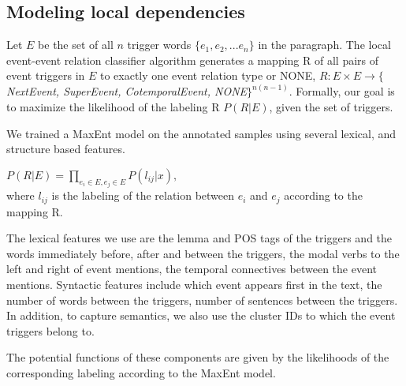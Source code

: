 \subsection{Modeling local dependencies}
Let $E$ be the set of all $n$ trigger words $\{e_1, e_2, ... e_{n}\}$ in the paragraph. The local event-event relation classifier algorithm generates a mapping R of all pairs of event triggers in $E$ to exactly one event relation type or NONE, $R : E \times E \rightarrow \{ $ {\em NextEvent, SuperEvent, CotemporalEvent, NONE}$ \}^{n (n-1)}$. Formally, our goal is to maximize the likelihood of the labeling R $P(R | E)$, given the set of triggers.

We trained a MaxEnt model on the annotated samples using several lexical, and structure based features.

$P(R | E) = \prod_{e_{i}\in E, e_j \in E} P(l_{ij} | x), $\\
where $l_{ij}$ is the labeling of the relation between $e_i$ and $e_j$ according to the mapping R.

The lexical features we use are the lemma and POS tags of the triggers and the words immediately before, after and between the triggers, the modal verbs to the left and right of event mentions, the temporal connectives between the event mentions. Syntactic features include which event appears first in the text, the number of words between the triggers, number of sentences between the triggers. In addition, to capture semantics, we also use the cluster IDs to which the event triggers belong to.

The potential functions of these components are given by the likelihoods of the corresponding labeling according to the MaxEnt model.